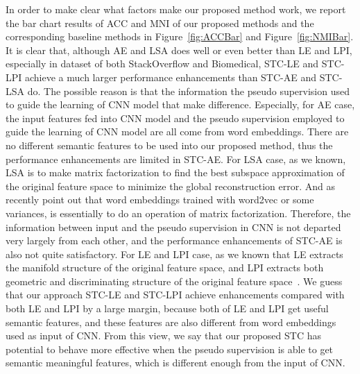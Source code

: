 \documentclass[review]{elsarticle}
\begin{document}
In order to make clear what factors make our proposed method work, we report the bar chart results of ACC and MNI of our proposed methods and the corresponding baseline methods in Figure~\ref{fig:ACCBar} and Figure~\ref{fig:NMIBar}. It is clear that, although AE and LSA does well or even better than LE and LPI, especially in dataset of both StackOverflow and Biomedical, STC-LE and STC-LPI achieve a much larger performance enhancements than STC-AE and STC-LSA do. The possible reason is that the information the pseudo supervision used to guide the learning of CNN model that make difference. Especially, for AE case, the input features fed into CNN model and the pseudo supervision employed to guide the learning of CNN model are all come from word embeddings. There are no different semantic features to be used into our proposed method, thus the performance enhancements are limited in STC-AE. For LSA case, as we known, LSA is to make matrix factorization to find the best subspace approximation of the original feature space to minimize the global reconstruction error. And as~\cite{26_pennington2014glove,li2015mfp} recently point out that word embeddings trained with word2vec or some variances, is essentially to do an operation of matrix factorization. Therefore, the information between input and the pseudo supervision in CNN is not departed very largely from each other, and the performance enhancements of STC-AE is also not quite satisfactory. For LE and LPI case, as we known that LE extracts the manifold structure of the original feature space, and LPI extracts both geometric and discriminating structure of the original feature space~\cite{4_cai2005document}. We guess that our approach STC-LE and STC-LPI achieve enhancements compared with both LE and LPI by a large margin, because both of LE and LPI get useful semantic features, and these features are also different from word embeddings used as input of CNN. From this view, we say that our proposed STC has potential to behave more effective when the pseudo supervision is able to get semantic meaningful features, which is different enough from the input of CNN.
\end{document}

